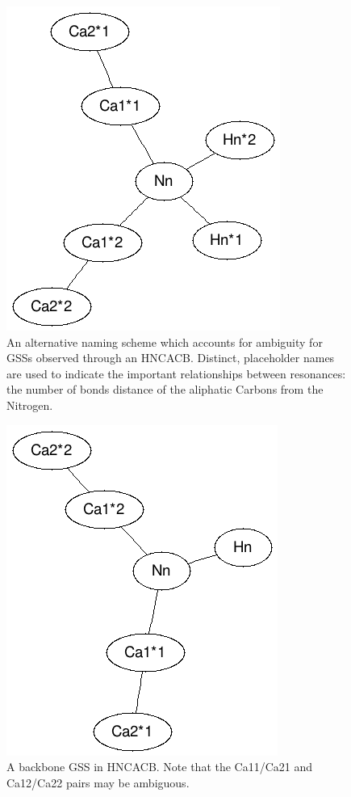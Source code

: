 \begin{figure}
  \includegraphics[scale=0.75]{figures/generic_hncacb_ambiguous}
  \caption[An alternative naming scheme which accounts for ambiguity.]
          {An alternative naming scheme which accounts for ambiguity for
           GSSs observed through an HNCACB.  Distinct, placeholder names are
           used to indicate the important relationships between resonances:
           the number of bonds distance of the aliphatic Carbons from the
           Nitrogen.}
  \label{generic_hncacb_ambiguous}
\end{figure}

\begin{figure}
  \includegraphics[scale=0.75]{figures/backbone_hncacb_ambiguous}
  \caption[A backbone GSS in HNCACB.]
          {A backbone GSS in HNCACB.  Note that 
           the Ca11/Ca21 and Ca12/Ca22 pairs may be ambiguous.}
  \label{backbone_hncacb_ambiguous}
\end{figure}

